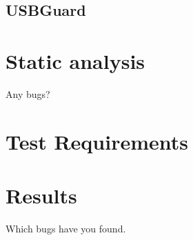 \subsection{USBGuard}

\section{Static analysis}
Any bugs?

\section{Test Requirements}

\section{Results}
Which bugs have you found.



